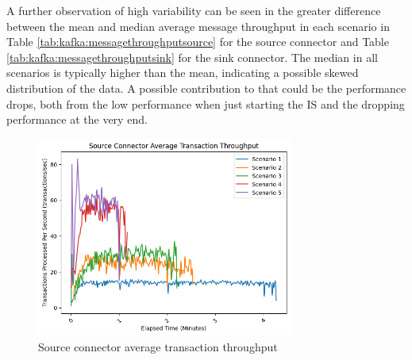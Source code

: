 A further observation of high variability can be seen in the greater difference between the mean and median average message throughput in each scenario in Table \ref{tab:kafka:messagethroughputsource} for the source connector and Table \ref{tab:kafka:messagethroughputsink} for the sink connector. The median in all scenarios is typically higher than the mean, indicating a possible skewed distribution of the data. A possible contribution to that could be the performance drops, both from the low performance when just starting the \ac{IS} and the dropping performance at the very end.


\begin{figure}[htbp]
    \centering
    \includegraphics[width=0.75\textwidth]{chapters/images/allscenarios/source-avg-runs-all-scenarios-transaction.png}
    \caption{Source connector average transaction throughput}
    \label{fig:chapter06:results:sourceallscenariostrans}
\end{figure}

